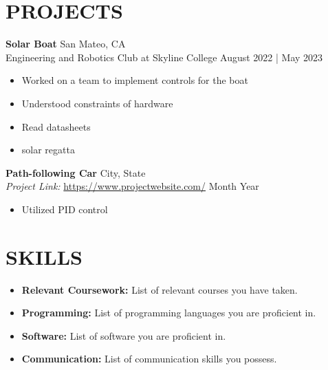 \documentclass[letterpaper,9pt]{extarticle}
\begin{document}
\section*{PROJECTS}
\noindent
\textbf{Solar Boat} \hfill San Mateo, CA\\ %
Engineering and Robotics Club at Skyline College \hfill August 2022 | May 2023 %
\begin{itemize}
	\item Worked on a team to implement controls for the boat
	\item Understood constraints of hardware
	\item Read datasheets
	\item solar regatta
\end{itemize}

\noindent
\textbf{Path-following Car} \hfill City, State\\ %
\textit{Project Link:} \url{https://www.projectwebsite.com/} \hfill Month Year %
\begin{itemize}
	\item Utilized PID control
\end{itemize}

\section*{SKILLS}
\begin{itemize}
	\item \textbf{Relevant Coursework:} List of relevant courses you have taken. %
	\item \textbf{Programming:} List of programming languages you are proficient in. %
	\item \textbf{Software:} List of software you are proficient in. %
	\item \textbf{Communication:} List of communication skills you possess. %
\end{itemize}

\end{document}
